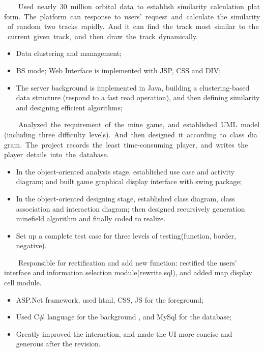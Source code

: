 \documentclass{resume}
\begin{document}
{\ \ \ \ Used\ nearly\ 30\ million\ orbital\ data\ to\ establish\ similarity\ calculation\ platform.\ The\ platform\ can\ response\ to\ users'\ request\ and\ calculate\ the\ similarity\ of\ random\ two\ tracks\ rapidly.\ And\ it\ can\ find\ the\ track\ most\ similar\ to\ the\ current\ given\ track,\ and\ then\ draw\ the\ track\ dynamically. }
\begin{itemize}
  \item Data clustering and management;
  \item BS mode; Web Interface is implemented with JSP, CSS and DIV;
  \item The server background is implemented in Java, building a clustering-based data structure (respond to a fast read operation), and then defining similarity and designing efficient algorithms;
\end{itemize}
\medskip


{\ \ \ \ Analyzed\ the\ requirement\ of\ the\ mine\ game,\ and\ established\ UML\ model(including\ three\ difficulty\ levels).\ And\ then\ designed\ it\ according\ to\ class\ diagram.\ The\ project\ records\ the\ least\ time-consuming\ player,\ and\ writes\ the player\ details\ into\ the\ database.}
\begin{itemize}
  \item In the object-oriented analysis stage, established use case and activity diagram; and built game graphical display interface with swing package;
  \item In the object-oriented designing stage, established class diagram, class association and interaction diagram; then designed recursively generation minefield algorithm and finally coded to realize.
  \item Set up a complete test case for three levels of testing(function, border, negative).
\end{itemize}
\medskip


{\ \ \ \ Responsible for rectification and add new function: rectified the users' interface and information selection module(rewrite sql), and added map display cell module.}
\begin{itemize}
  \item ASP.Net framework, used html, CSS, JS for the foreground;
  \item Used C\# language for the background , and MySql for the database;
  \item Greatly improved the interaction, and made the UI more concise and generous after the revision.
\end{itemize}
\medskip
\end{document}
